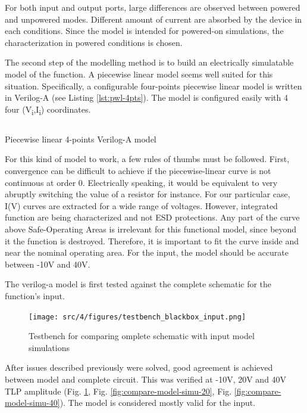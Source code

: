 For both input and output ports, large differences are observed between powered and unpowered modes.
Different amount of current are absorbed by the device in each conditions.
Since the model is intended for powered-on simulations, the characterization in powered conditions is chosen.

The second step of the modelling method is to build an electrically simulatable model of the function.
A piecewise linear model seems well suited for this situation.
Specifically, a configurable four-points piecewise linear model is written in Verilog-A (see Listing \ref{lst:pwl-4pts}).
The model is configured easily with 4 four (V\textsubscript{i},I\textsubscript{i}) coordinates.

\begin{code}
\inputminted[frame=single]{verilog}{src/4/snippets/pwl_4pts.va}
\caption{Piecewise linear 4-points Verilog-A model}
\label{lst:pwl-4pts}
\end{code}


For this kind of model to work, a few rules of thumbs must be followed.
First, convergence can be difficult to achieve if the piecewise-linear curve is not continuous at order 0.
Electrically speaking, it would be equivalent to very abruptly switching the value of a resistor for instance.
For our particular case, I(V) curves are extracted for a wide range of voltages.
However, integrated function are being characterized and not ESD protections.
Any part of the curve above Safe-Operating Areas is irrelevant for this functional model, since beyond it the function is destroyed.
Therefore, it is important to fit the curve inside and near the nominal operating area.
For the input, the model should be accurate between -10V and 40V.

The verilog-a model is first tested against the complete schematic for the function's input.

\begin{figure}[!h]
  \centering
  \texttt{[image: src/4/figures/testbench\_blackbox\_input.png]}
  \caption{Testbench for comparing omplete schematic with input model simulations}
  \label{fig:compare-model-simu-m10}
\end{figure}

After issues described previously were solved, good agreement is achieved between model and complete circuit.
This was verified at -10V, 20V and 40V TLP amplitude (Fig. \ref{fig:compare-model-simu-m10}, Fig. \ref{fig:compare-model-simu-20}, Fig. \ref{fig:compare-model-simu-40}).
The model is considered mostly valid for the input.

